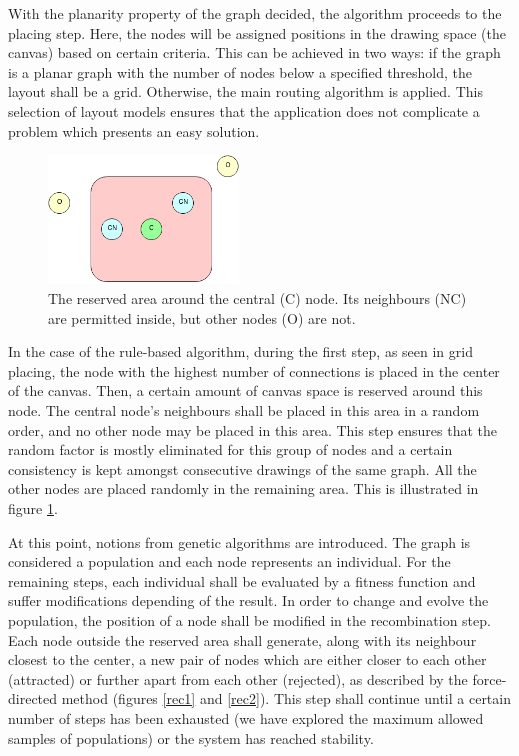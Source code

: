 With the planarity property of the graph decided, the algorithm proceeds to the placing step. Here, the nodes will be assigned positions in the 
drawing space (the canvas) based on certain criteria. This can be achieved in two ways: if the graph is a planar graph with the number of nodes 
below a specified threshold, the layout shall be a grid. Otherwise, the main routing algorithm is applied. This selection of layout models ensures 
that the application does not complicate a problem which presents an easy solution.

\begin{figure}[ht] \centering
\includegraphics[width=0.45\textwidth]{img/algdesing/centralnode.png}
\caption{The reserved area around the central (C) node. Its neighbours (NC) are permitted inside, but other nodes (O) are not. \label{central}} \end{figure}

In the case of the rule-based algorithm, during the first step, as seen in grid placing, the node with the highest number of connections is 
placed in the center of the canvas. Then, a certain amount of canvas space is reserved around this node. The central node's neighbours 
shall be placed in this area in a random order, and no other node may be placed in this area. This step ensures that the random factor is mostly eliminated 
 for this group of nodes and a certain consistency is kept amongst consecutive drawings of the same graph. All the other nodes are placed randomly in the remaining area.
This is illustrated in figure \ref{central}.

At this point, notions from genetic algorithms are introduced. The graph is considered a population and each node represents an individual. For the 
remaining steps, each individual shall be evaluated by a fitness function and suffer modifications depending of the result. In order to change and evolve 
the population, the position of a node shall be modified in the recombination step. Each node outside the reserved area shall generate, along with its neighbour closest to 
the center, a new pair of nodes which are either closer to each other (attracted) or further apart from each other (rejected), as described by the force-directed method (figures \ref{rec1} and \ref{rec2}). This step shall 
continue until a certain number of steps has been exhausted (we have explored the maximum allowed samples of populations) or the system has reached stability.

